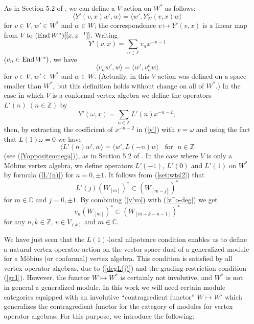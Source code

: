\documentclass[12pt]{article}
\begin{document}
As in Section 5.2 of \cite{FHL}, we can define a $V$-action on $W^*$
as follows:
\begin{equation}\label{y'}
\langle Y'(v,x)w',w\rangle = \langle w', Y^o_W(v,x)w\rangle
\end{equation}
for $v\in V$, $w'\in W^*$ and $w\in W$; the correspondence $v\mapsto
Y'(v,x)$ is a linear map {}from $V$ to $({\rm End}\,W^*)[[x,x^{-1}]]$.
Writing
\[
Y'(v,x)=\sum_{n\in {\mathbb Z}} v_n x^{-n-1}
\]
($v_n\in {\rm End}\,W^*)$, we have
\begin{equation}\label{v'vo}
\langle v_n w', w\rangle = \langle w', v^o_n w\rangle
\end{equation}
for $v\in V$, $w'\in W^*$ and $w\in W$.  (Actually, in \cite{FHL} this
$V$-action was defined on a space smaller than $W^*$, but this
definition holds without change on all of $W^*$.)  In the case in
which $V$ is a conformal vertex algebra we define the operators
$L'(n)\;(n\in {\mathbb Z})$ by
\[
Y'(\omega,x)=\sum_{n\in {\mathbb Z}}L'(n)x^{-n-2};
\]
then, by extracting the coefficient of $x^{-n-2}$ in (\ref{y'}) with
$v=\omega$ and using the fact that $L(1)\omega=0$ we have
\begin{equation}\label{L'(n)}
\langle L'(n)w',w\rangle=\langle w',L(-n)w\rangle\;\;\mbox{ for }\;n\in
{\mathbb Z}
\end{equation}
(see (\ref{Yoppositeomega})), as in Section 5.2 of \cite{FHL}.
In the case where $V$ is only a M\"obius vertex algebra, we define operators
$L'(-1)$, $L'(0)$ and $L'(1)$ on $W^*$ by formula (\ref{L'(n)}) for $n=0,
\pm 1$. It follows {}from (\ref{set:wtsl2}) that
\begin{equation}\label{L'(n)2}
L'(j)(W_{[m]})^*\subset (W_{[m-j]})^*
\end{equation}
for $m\in {\mathbb C}$ and $j=0,\pm 1$.  By combining (\ref{v'vo}) with
(\ref{v^o-deg}) we get
\begin{equation}\label{stable0}
v_n(W_{[m]})^*\subset (W_{[m+k-n-1]})^*
\end{equation}
for any $n,k\in {\mathbb Z}$, $v\in V_{(k)}$ and $m\in {\mathbb C}$.

We have just seen that the $L(1)$-local nilpotence
condition enables us to define a natural vertex operator action on the
vector space dual of a generalized module for a M\"obius (or
conformal) vertex algebra. This condition is satisfied by all
vertex operator algebras, due to (\ref{degL(j)}) and the grading
restriction condition (\ref{gr1}). However, the functor $W\mapsto W^*$
is certainly
not involutive, and $W^*$ is not in general a generalized module. In this work
we will need certain module categories equipped with an involutive
``contragredient functor'' $W\mapsto W'$ which generalizes the
contragredient functor for the category of modules for vertex operator
algebras. For this purpose, we introduce the following:
\end{document}
